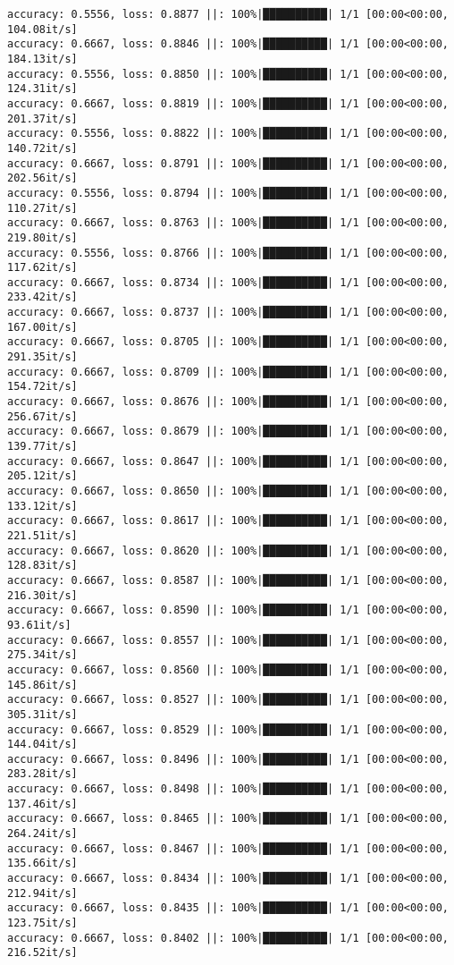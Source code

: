 \documentclass[
]{article}
\begin{document}
\begin{verbatim}
accuracy: 0.5556, loss: 0.8877 ||: 100%|██████████| 1/1 [00:00<00:00, 104.08it/s]
accuracy: 0.6667, loss: 0.8846 ||: 100%|██████████| 1/1 [00:00<00:00, 184.13it/s]
accuracy: 0.5556, loss: 0.8850 ||: 100%|██████████| 1/1 [00:00<00:00, 124.31it/s]
accuracy: 0.6667, loss: 0.8819 ||: 100%|██████████| 1/1 [00:00<00:00, 201.37it/s]
accuracy: 0.5556, loss: 0.8822 ||: 100%|██████████| 1/1 [00:00<00:00, 140.72it/s]
accuracy: 0.6667, loss: 0.8791 ||: 100%|██████████| 1/1 [00:00<00:00, 202.56it/s]
accuracy: 0.5556, loss: 0.8794 ||: 100%|██████████| 1/1 [00:00<00:00, 110.27it/s]
accuracy: 0.6667, loss: 0.8763 ||: 100%|██████████| 1/1 [00:00<00:00, 219.80it/s]
accuracy: 0.5556, loss: 0.8766 ||: 100%|██████████| 1/1 [00:00<00:00, 117.62it/s]
accuracy: 0.6667, loss: 0.8734 ||: 100%|██████████| 1/1 [00:00<00:00, 233.42it/s]
accuracy: 0.6667, loss: 0.8737 ||: 100%|██████████| 1/1 [00:00<00:00, 167.00it/s]
accuracy: 0.6667, loss: 0.8705 ||: 100%|██████████| 1/1 [00:00<00:00, 291.35it/s]
accuracy: 0.6667, loss: 0.8709 ||: 100%|██████████| 1/1 [00:00<00:00, 154.72it/s]
accuracy: 0.6667, loss: 0.8676 ||: 100%|██████████| 1/1 [00:00<00:00, 256.67it/s]
accuracy: 0.6667, loss: 0.8679 ||: 100%|██████████| 1/1 [00:00<00:00, 139.77it/s]
accuracy: 0.6667, loss: 0.8647 ||: 100%|██████████| 1/1 [00:00<00:00, 205.12it/s]
accuracy: 0.6667, loss: 0.8650 ||: 100%|██████████| 1/1 [00:00<00:00, 133.12it/s]
accuracy: 0.6667, loss: 0.8617 ||: 100%|██████████| 1/1 [00:00<00:00, 221.51it/s]
accuracy: 0.6667, loss: 0.8620 ||: 100%|██████████| 1/1 [00:00<00:00, 128.83it/s]
accuracy: 0.6667, loss: 0.8587 ||: 100%|██████████| 1/1 [00:00<00:00, 216.30it/s]
accuracy: 0.6667, loss: 0.8590 ||: 100%|██████████| 1/1 [00:00<00:00, 93.61it/s]
accuracy: 0.6667, loss: 0.8557 ||: 100%|██████████| 1/1 [00:00<00:00, 275.34it/s]
accuracy: 0.6667, loss: 0.8560 ||: 100%|██████████| 1/1 [00:00<00:00, 145.86it/s]
accuracy: 0.6667, loss: 0.8527 ||: 100%|██████████| 1/1 [00:00<00:00, 305.31it/s]
accuracy: 0.6667, loss: 0.8529 ||: 100%|██████████| 1/1 [00:00<00:00, 144.04it/s]
accuracy: 0.6667, loss: 0.8496 ||: 100%|██████████| 1/1 [00:00<00:00, 283.28it/s]
accuracy: 0.6667, loss: 0.8498 ||: 100%|██████████| 1/1 [00:00<00:00, 137.46it/s]
accuracy: 0.6667, loss: 0.8465 ||: 100%|██████████| 1/1 [00:00<00:00, 264.24it/s]
accuracy: 0.6667, loss: 0.8467 ||: 100%|██████████| 1/1 [00:00<00:00, 135.66it/s]
accuracy: 0.6667, loss: 0.8434 ||: 100%|██████████| 1/1 [00:00<00:00, 212.94it/s]
accuracy: 0.6667, loss: 0.8435 ||: 100%|██████████| 1/1 [00:00<00:00, 123.75it/s]
accuracy: 0.6667, loss: 0.8402 ||: 100%|██████████| 1/1 [00:00<00:00, 216.52it/s]

\end{verbatim}
\end{document}
